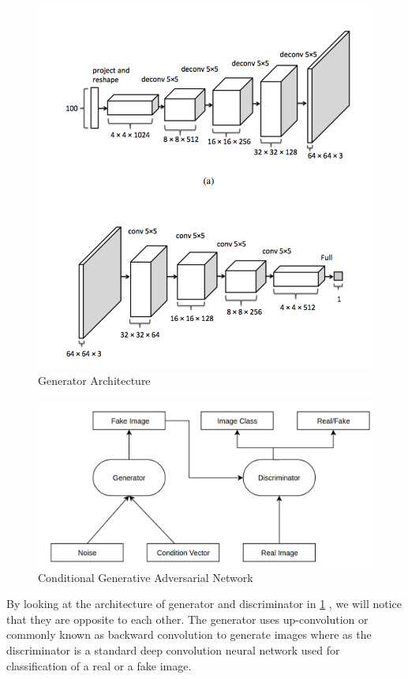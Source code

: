 \begin{figure}[H]
  \centering
    \includegraphics[scale=.3, angle=0]{Files/DCGAN.png}
    \caption[Generator Architecture]{Generator Architecture\cite{DCGAN}}
    \label{fig:DCGAN}
\end{figure}

\begin{figure}[H]
  \centering
    \includegraphics[scale=.3, angle=0]{Files/cgan.png}
    \caption[Conditional Generative Adversarial Network]{Conditional Generative Adversarial Network}
    \label{fig:CGAN}
\end{figure}
By looking at the architecture of generator and discriminator in \cref{fig:DCGAN} , we will notice that they are  opposite to each other. The generator uses up-convolution or commonly known as backward convolution to generate images where as %
the discriminator is a standard deep convolution neural network used for classification of a real or a fake image.

